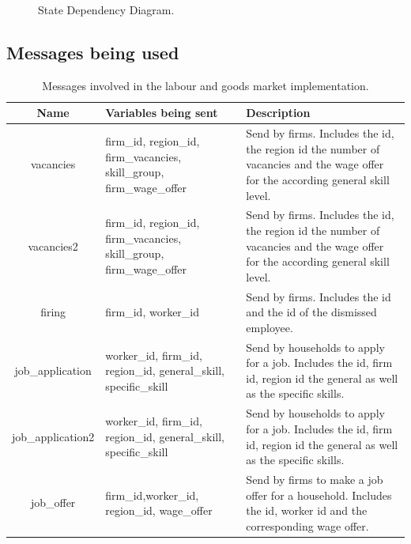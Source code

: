 \begin{figure}[!htb]
\begin{center}
 \caption{State Dependency Diagram.} \label{fig:statelabour}
 \end{center}
 \end{figure}


\subsection{Messages being used}



\begin{table}[!htb]\caption{Messages involved in the labour and goods market implementation.}
\begin{center}
\begin{tabular}{|c|l|l|}
\hline
Name & Variables being sent & Description \\
\hline

vacancies & {\parbox[l]{5cm}{firm\_id, region\_id, firm\_vacancies,
skill\_group, firm\_wage\_offer}}& {\parbox[l]{5cm}{Send by firms.
Includes the id, the region id the number of vacancies and the
wage offer for the according general skill level.}} \\

\hline

vacancies2 & {\parbox[l]{5cm}{firm\_id, region\_id, firm\_vacancies,
skill\_group, firm\_wage\_offer}}& {\parbox[l]{5cm}{Send by firms.
Includes the id, the region id the number of vacancies and the
wage offer for the according general skill level.}} \\
\hline

firing & {\parbox[l]{5cm}{firm\_id, worker\_id}}
& {\parbox[l]{5cm}{Send by firms. Includes the id and the id of the dismissed employee.}}  \\

\hline

job\_application & {\parbox[l]{5cm}{worker\_id, firm\_id,
region\_id, general\_skill, specific\_skill}} &
{\parbox[l]{5cm}{Send by households to apply for a job. Includes the
id, firm id, region id the general
as well as the specific skills.}}   \\
\hline


job\_application2 & {\parbox[l]{5cm}{worker\_id, firm\_id,
region\_id, general\_skill, specific\_skill}} &
{\parbox[l]{5cm}{Send by households to apply for a job. Includes the
id, firm id, region id the general
as well as the specific skills.}}   \\
\hline


job\_offer & {\parbox[l]{5cm}{ firm\_id,worker\_id, region\_id,
wage\_offer}} & {\parbox[l]{5cm}{Send by firms to make a job offer
for a household. Includes the id, worker id and the
corresponding wage offer.}}   \\


\end{tabular}
\end{center}
\end{table}
